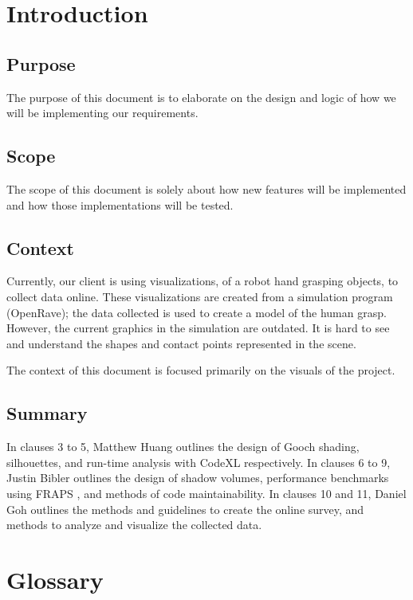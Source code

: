 \documentclass[10pt,journal,compsoc,draftclsnofoot]{IEEEtran}
\begin{document}
\section{Introduction}
\begin{flushleft}

\subsection{Purpose}
The purpose of this document is to elaborate on the design and logic of how we will be implementing our requirements.

\subsection{Scope}
The scope of this document is solely about how new features will be implemented and how those implementations will be tested.

\subsection{Context}
Currently, our client is using visualizations, of a robot hand grasping objects, to collect data online.
These visualizations are created from a simulation program (OpenRave); the data collected is used to create a model of the human grasp.
However, the current graphics in the simulation are outdated.
It is hard to see and understand the shapes and contact points represented in the scene.

The context of this document is focused primarily on the visuals of the project.

\subsection{Summary}
In clauses 3 to 5, Matthew Huang outlines the design of Gooch shading, silhouettes, and run-time analysis with CodeXL respectively.
In clauses 6 to 9, Justin Bibler outlines the design of shadow volumes, performance benchmarks using FRAPS \cite{fraps}, and methods of code maintainability.
In clauses 10 and 11, Daniel Goh outlines the methods and guidelines to create the online survey, and methods to analyze and visualize the collected data.

\newpage




\section{Glossary}


\end{flushleft}
\end{document}
